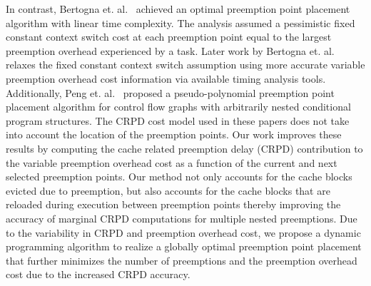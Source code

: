 \indent
In contrast, Bertogna et. al.~\cite{bertogna:10} achieved an optimal preemption point placement algorithm with linear time complexity.  The analysis assumed a pessimistic fixed constant context switch cost at each preemption point equal to the largest preemption overhead experienced by a task.  Later work by Bertogna et. al.~\cite{bertogna:11} relaxes the fixed constant context switch assumption using more accurate variable preemption overhead cost information via available timing analysis tools.  Additionally, Peng et. al.~\cite{peng:14} proposed a pseudo-polynomial preemption point placement algorithm for control flow graphs with arbitrarily nested conditional program structures.  The CRPD cost model used in these papers does not take into account the location of the preemption points.
\newline
\indent
Our work improves these results by computing the cache related preemption delay (CRPD) contribution to the variable preemption overhead cost as a function of the current and next selected preemption points.  Our method not only accounts for the cache blocks evicted due to preemption, but also accounts for the cache blocks that are reloaded during execution between preemption points thereby improving the accuracy of marginal CRPD computations for multiple nested preemptions.
\newline
\indent
Due to the variability in CRPD and preemption overhead cost, we propose a dynamic programming algorithm to realize a globally optimal preemption point placement that further minimizes the number of preemptions and the preemption overhead cost due to the increased CRPD accuracy.

